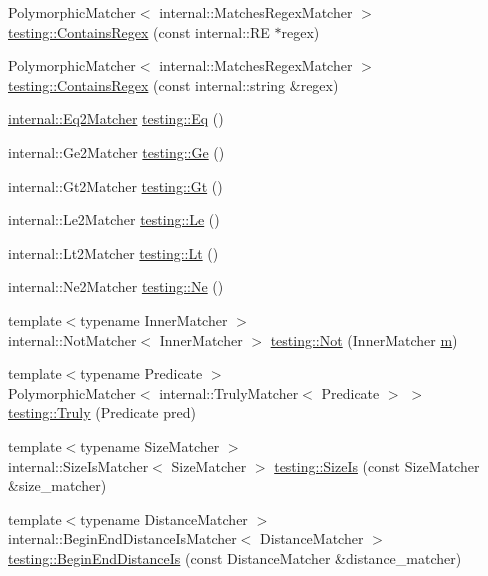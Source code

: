 \begin{DoxyCompactItemize}
\item 
Polymorphic\+Matcher$<$ internal\+::\+Matches\+Regex\+Matcher $>$ \hyperlink{namespacetesting_a899838630a71376aa071dfd7c500f2ca}{testing\+::\+Contains\+Regex} (const internal\+::\+RE $\ast$regex)
\item 
Polymorphic\+Matcher$<$ internal\+::\+Matches\+Regex\+Matcher $>$ \hyperlink{namespacetesting_ad8efafa15630a8274f41f5e22f8f0e49}{testing\+::\+Contains\+Regex} (const internal\+::string \&regex)
\item 
\hyperlink{classes__f_8js_a54ad80d974e0a8da0c9866407894a38d}{internal\+::\+Eq2\+Matcher} \hyperlink{namespacetesting_aa7771a34f092fd6f1dca2c82fb2a36a1}{testing\+::\+Eq} ()
\item 
internal\+::\+Ge2\+Matcher \hyperlink{namespacetesting_a8cc0a6519e30bedf52c6e53c71e18265}{testing\+::\+Ge} ()
\item 
internal\+::\+Gt2\+Matcher \hyperlink{namespacetesting_a3eaae6408f77ba7d87ca2d6a21dbde77}{testing\+::\+Gt} ()
\item 
internal\+::\+Le2\+Matcher \hyperlink{namespacetesting_a04def1c627ea7e3fce2f08cb06e83ebc}{testing\+::\+Le} ()
\item 
internal\+::\+Lt2\+Matcher \hyperlink{namespacetesting_a3b4d6d29d715c1bf219163f5206b53d4}{testing\+::\+Lt} ()
\item 
internal\+::\+Ne2\+Matcher \hyperlink{namespacetesting_a0cde8994764617eebc751e682c28d4ae}{testing\+::\+Ne} ()
\item 
{\footnotesize template$<$typename Inner\+Matcher $>$ }\\internal\+::\+Not\+Matcher$<$ Inner\+Matcher $>$ \hyperlink{namespacetesting_a3d7d0dda7e51b13fe2f5aa28e23ed6b6}{testing\+::\+Not} (Inner\+Matcher \hyperlink{variables__e_8js_aab4247b6acebcba996939b177f483c14}{m})
\item 
{\footnotesize template$<$typename Predicate $>$ }\\Polymorphic\+Matcher$<$ internal\+::\+Truly\+Matcher$<$ Predicate $>$ $>$ \hyperlink{namespacetesting_a5faf05cfaae6074439960048e478b1c8}{testing\+::\+Truly} (Predicate pred)
\item 
{\footnotesize template$<$typename Size\+Matcher $>$ }\\internal\+::\+Size\+Is\+Matcher$<$ Size\+Matcher $>$ \hyperlink{namespacetesting_acd5e215558f95f1393c048a6d496060d}{testing\+::\+Size\+Is} (const Size\+Matcher \&size\+\_\+matcher)
\item 
{\footnotesize template$<$typename Distance\+Matcher $>$ }\\internal\+::\+Begin\+End\+Distance\+Is\+Matcher$<$ Distance\+Matcher $>$ \hyperlink{namespacetesting_a122739b5b6bd9f993f26800dafdb4cc3}{testing\+::\+Begin\+End\+Distance\+Is} (const Distance\+Matcher \&distance\+\_\+matcher)

\end{DoxyCompactItemize}
